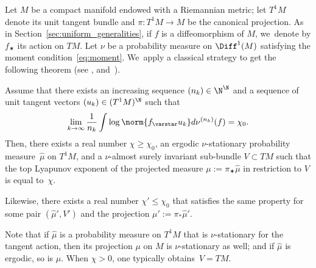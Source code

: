 Let $M$ be a compact manifold endowed with a Riemannian metric; let $T^1M$ denote its unit tangent bundle
and $\pi\colon T^1M\to M$ be the canonical projection. As in Section~\ref{sec:uniform_generalities},
if $f$ is a diffeomorphism of $M$, we~denote by $f_\varstar $ its action on $TM$.
Let $\nu$ be a probability measure on $\Diff^1(M)$
satisfying the moment condition~\eqref{eq:moment}. We~apply a classical strategy to get the
following theorem (see \eg \cite[Prop.\,3.17]{chung}, and~\cite[Lem.\,3.3]{hurtado:burnside}).

\begin{thm}\label{thm:limit_measure_top_lyapunov}
Assume that there exists an increasing sequence $(n_k)\in \N^\N$ and a
sequence of unit tangent vectors $( u_k)\in (T^1M)^\N$
such that
\begin{equation*}\label{eq:exponential_dilatation}
\lim_{k\to\infty} \frac{1}{n_k} \int \log \norm{f_\varstar u_k} d\nu^{(n_k)}(f) = \chi_0.
\end{equation*}
Then, there exists a real number $\chi\geq \chi_0$, an ergodic $\nu$-stationary probability measure~$\hat{\mu}$
on $T^1M$, and a $\nu$-almost surely invariant sub-bundle $V\subset TM$ such that the top Lyapunov exponent of the projected measure $\mu:=\pi_\varstar \hat{\mu}$ in restriction to $V$ is equal to~$\chi$.

Likewise, there exists
a real number $\chi' \leq \chi_0$ that satisfies the same property for
some pair $(\hat{\mu}', V')$ and the projection $\mu':= \pi_*\hat{\mu}'$.
\end{thm}

Note that if $\hat\mu$ is a probability measure on $T^1M$ that is
$\nu$-stationary for the tangent action, then its projection $\mu $ on $M$ is $\nu$-stationary as well; and if $\hat\mu$ is ergodic, so is $\mu$.
When $\chi >0$, one typically obtains~$V=TM$.

